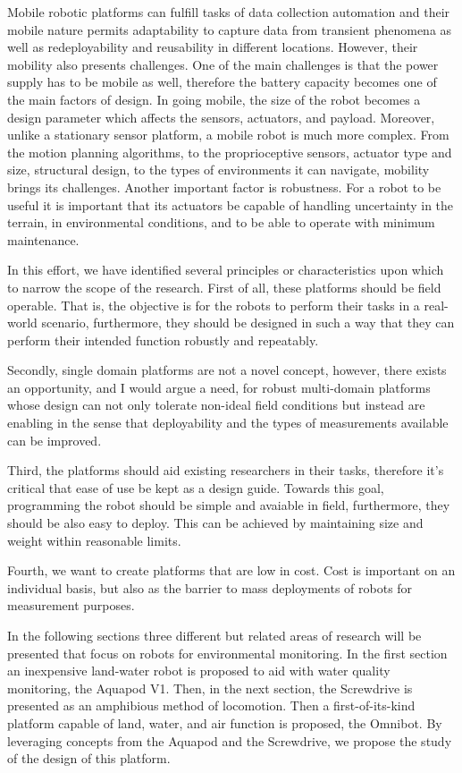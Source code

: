 	Mobile robotic platforms can fulfill tasks of data collection automation and their mobile nature permits adaptability to capture data from transient phenomena as well as redeployability and reusability in different locations. However, their mobility also presents challenges. One of the main challenges is that the power supply has to be mobile as well, therefore the battery capacity becomes one of the main factors of design. In going mobile, the size of the robot becomes a design parameter which affects the sensors, actuators, and payload. Moreover, unlike a stationary sensor platform, a mobile robot is much more complex. From the motion planning algorithms, to the proprioceptive sensors, actuator type and size, structural design, to the types of environments it can navigate, mobility brings its challenges. Another important factor is robustness. For a robot to be useful it is important that its actuators be capable of handling uncertainty in the terrain, in environmental conditions, and to be able to operate with minimum maintenance.  


	In this effort, we have identified several principles or characteristics upon which to narrow the scope of the research. First of all, these platforms should be field operable. That is, the objective is for the robots to perform their tasks in a real-world scenario, furthermore, they should be designed in such a way that they can perform their intended function robustly and repeatably. 

	Secondly, single domain platforms are not a novel concept, however, there exists an opportunity, and I would argue a need, for robust multi-domain platforms whose design can not only tolerate non-ideal field conditions but instead are enabling in the sense that deployability and the types of measurements available can be improved. 

	Third, the platforms should aid existing researchers in their tasks, therefore it's critical that ease of use be kept as a design guide. Towards this goal, programming the robot should be simple and avaiable in field, furthermore, they should be also easy to deploy. This can be achieved by maintaining size and weight within reasonable limits. 

	Fourth, we want to create platforms that are low in cost. Cost is important on an individual basis, but also as the barrier to mass deployments of robots for measurement purposes. 

	In the following sections three different but related areas of research will be presented that focus on robots for environmental monitoring. In the first section an inexpensive land-water robot is proposed to aid with water quality monitoring, the Aquapod V1. Then, in the next section, the Screwdrive is presented as an amphibious method of locomotion. Then a first-of-its-kind platform capable of land, water, and air function is proposed, the Omnibot. By leveraging concepts from the Aquapod and the Screwdrive, we propose the study of the design of this platform. 
	
